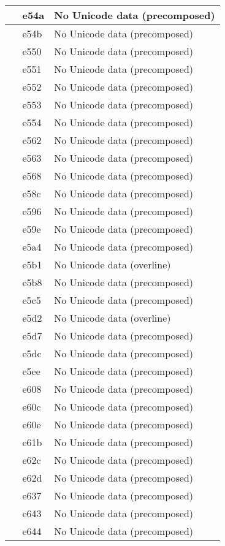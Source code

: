\documentclass[12pt,letterpaper,openany]{book}
\begin{document}
\begin{center}
\begin{supertabular}{|m{0.25in}|m{0.5in}|m{4in}|}
 & e54a & No Unicode data (precomposed)\\\hline
 & e54b & No Unicode data (precomposed)\\\hline
 & e550 & No Unicode data (precomposed)\\\hline
 & e551 & No Unicode data (precomposed)\\\hline
 & e552 & No Unicode data (precomposed)\\\hline
 & e553 & No Unicode data (precomposed)\\\hline
 & e554 & No Unicode data (precomposed)\\\hline
 & e562 & No Unicode data (precomposed)\\\hline
 & e563 & No Unicode data (precomposed)\\\hline
 & e568 & No Unicode data (precomposed)\\\hline
 & e58c & No Unicode data (precomposed)\\\hline
 & e596 & No Unicode data (precomposed)\\\hline
 & e59e & No Unicode data (precomposed)\\\hline
 & e5a4 & No Unicode data (precomposed)\\\hline
 & e5b1 & No Unicode data (overline)\\\hline
 & e5b8 & No Unicode data (precomposed)\\\hline
 & e5c5 & No Unicode data (precomposed)\\\hline
 & e5d2 & No Unicode data (overline)\\\hline
 & e5d7 & No Unicode data (precomposed)\\\hline
 & e5dc & No Unicode data (precomposed)\\\hline
 & e5ee & No Unicode data (precomposed)\\\hline
 & e608 & No Unicode data (precomposed)\\\hline
 & e60c & No Unicode data (precomposed)\\\hline
 & e60e & No Unicode data (precomposed)\\\hline
 & e61b & No Unicode data (precomposed)\\\hline
 & e62c & No Unicode data (precomposed)\\\hline
 & e62d & No Unicode data (precomposed)\\\hline
 & e637 & No Unicode data (precomposed)\\\hline
 & e643 & No Unicode data (precomposed)\\\hline
 & e644 & No Unicode data (precomposed)\\\hline

\end{supertabular}
\end{center}
\end{document}
